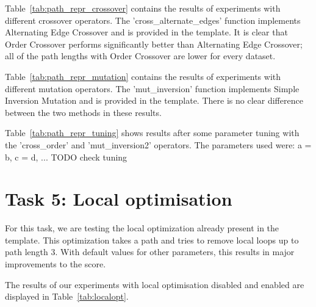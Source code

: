 \documentclass{report}
\begin{document}
Table~\ref{tab:path_repr_crossover} contains the results of experiments with different crossover operators. The 'cross\_alternate\_edges' function implements Alternating Edge Crossover and is provided in the template. It is clear that Order Crossover performs significantly better than Alternating Edge Crossover; all of the path lengths with Order Crossover are lower for every dataset.


Table~\ref{tab:path_repr_mutation} contains the results of experiments with different mutation operators. The 'mut\_inversion' function implements Simple Inversion Mutation and is provided in the template. There is no clear difference between the two methods in these results.


Table~\ref{tab:path_repr_tuning} shows results after some parameter tuning with the 'cross\_order' and 'mut\_inversion2' operators. The parameters used were: a = b, c = d, ... TODO  check tuning




\section{Task 5: Local optimisation}
\label{sec:local}
For this task, we are testing the local optimization already present in the template. This optimization takes a path and tries to remove local loops up to path length 3. With default values for other parameters, this results in major improvements to the score.

The results of our experiments with local optimisation disabled and enabled are displayed in Table~\ref{tab:localopt}.
\end{document}
